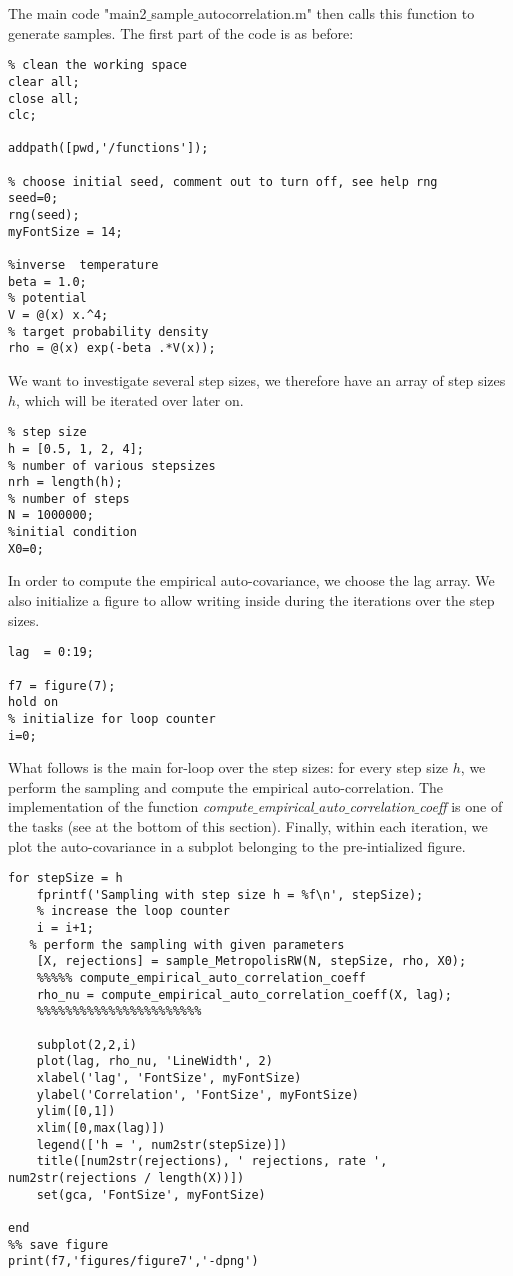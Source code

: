 \documentclass{scrartcl}
\begin{document}
The main code "main2$\_$sample$\_$autocorrelation.m" then calls this function to generate samples. The first part of the code is as before:
\begin{verbatim}
% clean the working space
clear all;
close all;
clc;

addpath([pwd,'/functions']);

% choose initial seed, comment out to turn off, see help rng
seed=0;
rng(seed);
myFontSize = 14;

%inverse  temperature 
beta = 1.0;
% potential
V = @(x) x.^4;
% target probability density
rho = @(x) exp(-beta .*V(x));
\end{verbatim}
We want to investigate several step sizes, we therefore have an array of step sizes $h$, which will be iterated over later on.
\begin{verbatim}
% step size
h = [0.5, 1, 2, 4];
% number of various stepsizes
nrh = length(h);
% number of steps 
N = 1000000;
%initial condition 
X0=0;
\end{verbatim}
In order to compute the empirical auto-covariance, we choose the lag array. We also initialize a figure to allow writing inside during the iterations over the step sizes.
\begin{verbatim}
lag  = 0:19;

f7 = figure(7);
hold on
% initialize for loop counter
i=0;
\end{verbatim}
What follows is the main for-loop over the step sizes: for every step size $h$, we perform the sampling and compute the empirical auto-correlation. The implementation of the function \textit{compute$\_$empirical$\_$auto$\_$correlation$\_$coeff} is one of the tasks (see at the bottom of this section). Finally, within each iteration, we plot the auto-covariance in a subplot belonging to the pre-intialized figure.
\begin{verbatim}
for stepSize = h 
    fprintf('Sampling with step size h = %f\n', stepSize);
    % increase the loop counter
    i = i+1;
   % perform the sampling with given parameters	
    [X, rejections] = sample_MetropolisRW(N, stepSize, rho, X0);
    %%%%% compute_empirical_auto_correlation_coeff
    rho_nu = compute_empirical_auto_correlation_coeff(X, lag);
    %%%%%%%%%%%%%%%%%%%%%%%
    
    subplot(2,2,i)
    plot(lag, rho_nu, 'LineWidth', 2)
    xlabel('lag', 'FontSize', myFontSize)
    ylabel('Correlation', 'FontSize', myFontSize)
    ylim([0,1])
    xlim([0,max(lag)])
    legend(['h = ', num2str(stepSize)])
    title([num2str(rejections), ' rejections, rate ', num2str(rejections / length(X))])
    set(gca, 'FontSize', myFontSize)

end
%% save figure
print(f7,'figures/figure7','-dpng')
\end{verbatim}
\end{document}
